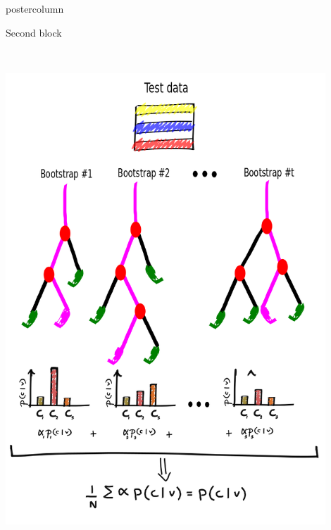 \documentclass[final]{beamer}
\begin{document}
\begin{frame}
\begin{columns}
\begin{column}{.49\textwidth}
\begin{beamercolorbox}[center,wd=\textwidth]{postercolumn}
\begin{minipage}[T]{.95\textwidth}
{\begin{block}{Second block}
\begin{itemize}
\begin{columns}
\begin{column}{.44\textwidth}
            		\\
            			\includegraphics[width = 0.9\textwidth, height = 0.15\textheight]{images/framework/RF_test.png}
            		\end{column}
            \end{columns}
            \end{itemize}
            \lipsum[1-2]
            \end{block}          
            \vfill
         
}
\end{minipage}
\end{beamercolorbox}
\end{column}
\end{columns}
\end{frame}
\end{document}
